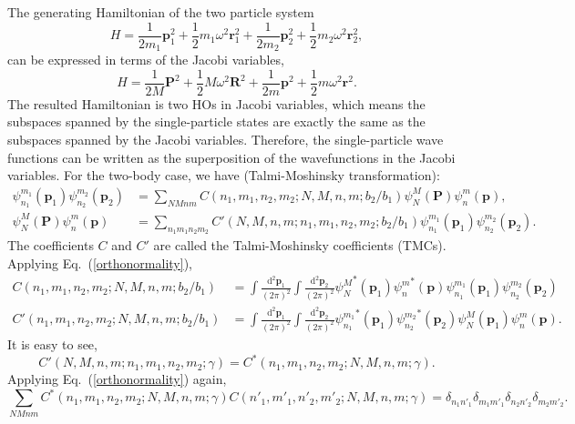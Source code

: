 \documentclass[a4paper,10pt]{article}
\begin{document}
The generating Hamiltonian of the two particle system 
\begin{equation}
   H = \frac{1}{2m_1}\bm p^2_1 + \frac{1}{2} m_1\omega^2 \bm r^2_1 + \frac{1}{2m_2}\bm p^2_2 + \frac{1}{2} m_2\omega^2 \bm r^2_2,
\end{equation}
can be expressed in terms of the Jacobi variables,
\begin{equation}
   H = \frac{1}{2M}\bm P^2 + \frac{1}{2} M\omega^2 \bm R^2 + \frac{1}{2m}\bm p^2 + \frac{1}{2} m\omega^2 \bm r^2.
\end{equation}
The resulted Hamiltonian is two HOs in Jacobi variables, which means the subspaces spanned by the single-particle 
states are exactly the same as the subspaces spanned by the Jacobi variables. Therefore, the single-particle wave functions
can be written as the superposition of the wavefunctions in the Jacobi variables. For the two-body case, we have (Talmi-Moshinsky
transformation):
\begin{align}
 \psi_{n_1}^{m_1}(\bm p_1) \psi_{n_2}^{m_2}(\bm p_2) &= \sum_{NMnm} C(n_1,m_1,n_2,m_2;N,M,n,m;b_2/b_1) \psi_{N}^M(\bm P) \psi_n^m(\bm p), \\
 \psi_{N}^M(\bm P) \psi_n^m(\bm p)  &= \sum_{n_1m_1n_2m_2} C'(N,M,n,m;n_1,m_1,n_2,m_2;b_2/b_1) \psi_{n_1}^{m_1}(\bm p_1) \psi_{n_2}^{m_2}(\bm p_2).
\end{align}
The coefficients $C$ and $C'$ are called the Talmi-Moshinsky coefficients (TMCs). Applying Eq.~(\ref{orthonormality}), 
%
\begin{align}
 C(n_1,m_1,n_2,m_2;N,M,n,m;b_2/b_1) &= \int \frac{\mathrm{d}^2\bm p_1}{(2\pi)^2} \int \frac{\mathrm{d}^2\bm p_2}{(2\pi)^2} 
 {\psi_{N}^{M}}^*(\bm p_1){\psi_{n}^{m}}^*(\bm p) \psi_{n_1}^{m_1}(\bm p_1)\psi_{n_2}^{m_2}(\bm p_2) \\
 C'(n_1,m_1,n_2,m_2;N,M,n,m;b_2/b_1) &= \int \frac{\mathrm{d}^2\bm p_1}{(2\pi)^2} \int \frac{\mathrm{d}^2\bm p_2}{(2\pi)^2} 
 {\psi_{n_1}^{m_1}}^*(\bm p_1){\psi_{n_2}^{m_2}}^*(\bm p_2) \psi_{N}^{M}(\bm p_1)\psi_{n}^{m}(\bm p). 
\end{align}
%
%
It is easy to see, 
\begin{equation}
  C'(N,M,n,m;n_1,m_1,n_2,m_2;\gamma) = C^*(n_1,m_1,n_2,m_2;N,M,n,m;\gamma).
\end{equation}
Applying Eq.~(\ref{orthonormality}) again, 
\begin{equation}
 \sum_{NMnm} C^*(n_1,m_1,n_2,m_2;N,M,n,m;\gamma)C(n'_1,m'_1,n'_2,m'_2;N,M,n,m;\gamma) = \delta_{n_1n'_1}\delta_{m_1m'_1}\delta_{n_2n'_2}\delta_{m_2m'_2}.
\end{equation}
 
\end{document}
